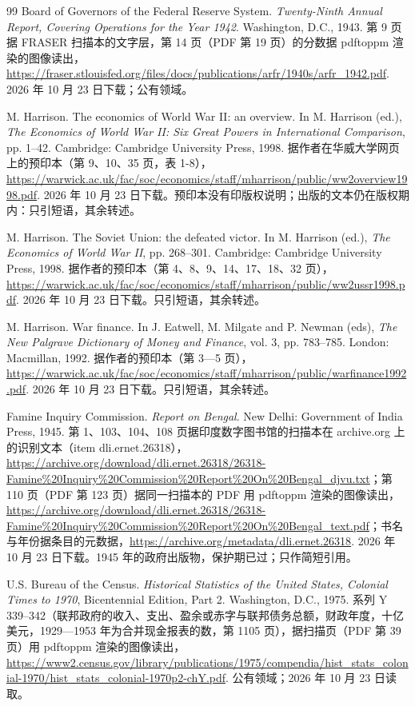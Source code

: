 \begin{thebibliography}{99}
 Board of Governors of the Federal Reserve System. \emph{Twenty-Ninth Annual Report, Covering Operations for the Year 1942}. Washington, D.C., 1943. 第 9 页据 FRASER 扫描本的文字层，第 14 页（PDF 第 19 页）的分数据 pdftoppm 渲染的图像读出，\url{https://fraser.stlouisfed.org/files/docs/publications/arfr/1940s/arfr_1942.pdf}. 2026 年 10 月 23 日下载；公有领域。

 M. Harrison. The economics of World War II: an overview. In M. Harrison (ed.), \emph{The Economics of World War II: Six Great Powers in International Comparison}, pp. 1--42. Cambridge: Cambridge University Press, 1998. 据作者在华威大学网页上的预印本（第 9、10、35 页，表 1-8），\url{https://warwick.ac.uk/fac/soc/economics/staff/mharrison/public/ww2overview1998.pdf}. 2026 年 10 月 23 日下载。预印本没有印版权说明；出版的文本仍在版权期内：只引短语，其余转述。

 M. Harrison. The Soviet Union: the defeated victor. In M. Harrison (ed.), \emph{The Economics of World War II}, pp. 268--301. Cambridge: Cambridge University Press, 1998. 据作者的预印本（第 4、8、9、14、17、18、32 页），\url{https://warwick.ac.uk/fac/soc/economics/staff/mharrison/public/ww2ussr1998.pdf}. 2026 年 10 月 23 日下载。只引短语，其余转述。

 M. Harrison. War finance. In J. Eatwell, M. Milgate and P. Newman (eds), \emph{The New Palgrave Dictionary of Money and Finance}, vol. 3, pp. 783--785. London: Macmillan, 1992. 据作者的预印本（第 3—5 页），\url{https://warwick.ac.uk/fac/soc/economics/staff/mharrison/public/warfinance1992.pdf}. 2026 年 10 月 23 日下载。只引短语，其余转述。

 Famine Inquiry Commission. \emph{Report on Bengal}. New Delhi: Government of India Press, 1945. 第 1、103、104、108 页据印度数字图书馆的扫描本在 archive.org 上的识别文本（item dli.ernet.26318），\url{https://archive.org/download/dli.ernet.26318/26318-Famine\%20Inquiry\%20Commission\%20Report\%20On\%20Bengal_djvu.txt}；第 110 页（PDF 第 123 页）据同一扫描本的 PDF 用 pdftoppm 渲染的图像读出，\url{https://archive.org/download/dli.ernet.26318/26318-Famine\%20Inquiry\%20Commission\%20Report\%20On\%20Bengal_text.pdf}；书名与年份据条目的元数据，\url{https://archive.org/metadata/dli.ernet.26318}. 2026 年 10 月 23 日下载。1945 年的政府出版物，保护期已过；只作简短引用。

 U.S. Bureau of the Census. \emph{Historical Statistics of the United States, Colonial Times to 1970}, Bicentennial Edition, Part 2. Washington, D.C., 1975. 系列 Y 339--342（联邦政府的收入、支出、盈余或赤字与联邦债务总额，财政年度，十亿美元，1929—1953 年为合并现金报表的数，第 1105 页），据扫描页（PDF 第 39 页）用 pdftoppm 渲染的图像读出，\url{https://www2.census.gov/library/publications/1975/compendia/hist_stats_colonial-1970/hist_stats_colonial-1970p2-chY.pdf}. 公有领域；2026 年 10 月 23 日读取。


\end{thebibliography}
